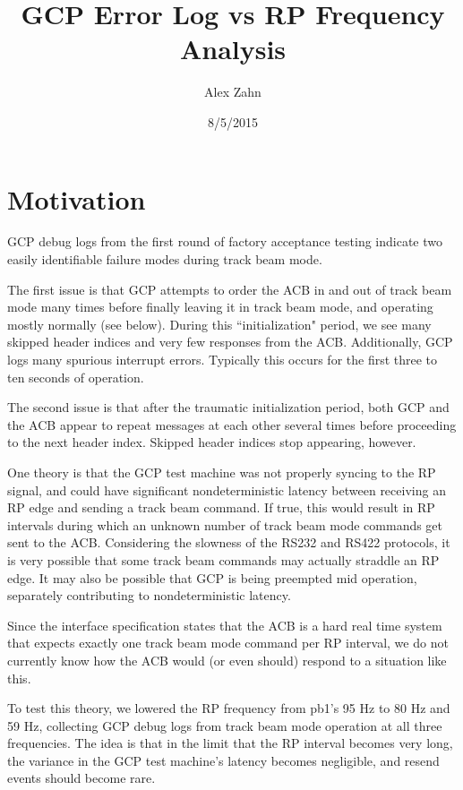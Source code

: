 \documentclass[12pt]{article}
\begin{document}
\title{GCP Error Log vs RP Frequency Analysis}
\date{8/5/2015}
\author{Alex Zahn}

\maketitle

\section{Motivation}

GCP debug logs from the first round of factory acceptance testing indicate two easily identifiable failure modes during track beam mode.

The first issue is that GCP attempts to order the ACB in and out of track beam mode many times before finally leaving it in track beam mode, and operating mostly normally (see below). During this ``initialization" period, we see many skipped header indices and very few responses from the ACB. Additionally, GCP logs many spurious interrupt errors. Typically this occurs for the first three to ten seconds of operation.

The second issue is that after the traumatic initialization period, both GCP and the ACB appear to repeat messages at each other several times before proceeding to the next header index. Skipped header indices stop appearing, however.

One theory is that the GCP test machine was not properly syncing to the RP signal, and could have significant nondeterministic latency between receiving an RP edge and sending a track beam command. If true, this would result in RP intervals during which an unknown number of track beam mode commands get sent to the ACB. Considering the slowness of the RS232 and RS422 protocols, it is very possible that some track beam commands may actually straddle an RP edge. It may also be possible that GCP is being preempted mid operation, separately contributing to nondeterministic latency.

Since the interface specification states that the ACB is a hard real time system that expects exactly one track beam mode command per RP interval, we do not currently know how the ACB would (or even should) respond to a situation like this. 

To test this theory, we lowered the RP frequency from pb1's 95 Hz to 80 Hz and 59 Hz, collecting GCP debug logs from track beam mode operation at all three frequencies. The idea is that in the limit that the RP interval becomes very long, the variance in the GCP test machine's latency becomes negligible, and resend events should become rare.
\end{document}

